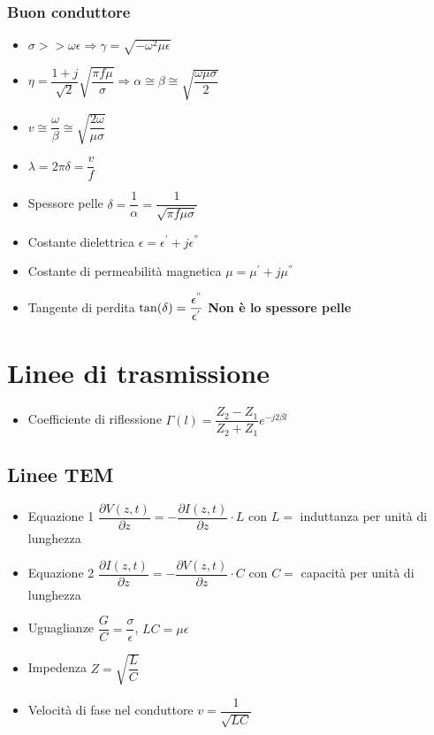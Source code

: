 \documentclass{article}
\begin{document}
\subsubsection{Buon conduttore}
\begin{itemize}
	\item \( \sigma >> \omega \epsilon \Rightarrow \gamma = \sqrt{-\omega^2 \mu \epsilon} \)
	\item \( \eta = \dfrac{1+j}{\sqrt{2}} \sqrt{\dfrac{\pi f \mu}{\sigma}} \Rightarrow \alpha \cong \beta
	\cong \sqrt{\dfrac{\omega \mu \sigma}{2}} \)
	\item \( v \cong \dfrac{\omega}{\beta} \cong \sqrt{\dfrac{2 \omega}{\mu \sigma}} \)
	\item \( \lambda = 2 \pi \delta = \dfrac{v}{f} \)
	\item Spessore pelle \( \delta = \dfrac{1}{\alpha} = \dfrac{1}{\sqrt{\pi f \mu \sigma}} \)
	\item Costante dielettrica \( \epsilon = \epsilon ^ { ' } + j \epsilon ^ { '' } \)
	\item Costante di permeabilità magnetica \( \mu = \mu ^ { ' } + j \mu ^ { '' } \)
	\item Tangente di perdita \(\tan(\delta) = \dfrac{\epsilon^ { " }}{\epsilon^ {'} }\) \textbf{Non è lo spessore pelle}
\end{itemize}

\newpage

\section{Linee di trasmissione}
\begin{itemize}
	\item Coefficiente di riflessione \( \Gamma(l) = \dfrac{Z_2 - Z_1}{Z_2 + Z_1} e^{-j 2 \beta l} \)
\end{itemize}

\subsection{Linee TEM}
\begin{itemize}
	\item Equazione 1 \( \dfrac{\partial V(z, t)}{\partial z} = - \dfrac{\partial I(z, t)}{\partial z} \cdot L\) con \(L = \) induttanza per unità di lunghezza
	\item Equazione 2 \( \dfrac{\partial I(z, t)}{\partial z} = - \dfrac{\partial V(z, t)}{\partial z} \cdot C\) con \(C = \) capacità per unità di lunghezza
	\item Uguaglianze \( \dfrac{G}{C} = \dfrac{\sigma}{\epsilon} \), \(L C = \mu \epsilon  \)
	\item Impedenza \( Z = \sqrt{\dfrac{L}{C}} \)
	\item Velocità di fase nel conduttore \( v = \dfrac{1}{\sqrt{LC}} \)
\end{itemize}
\end{document}

